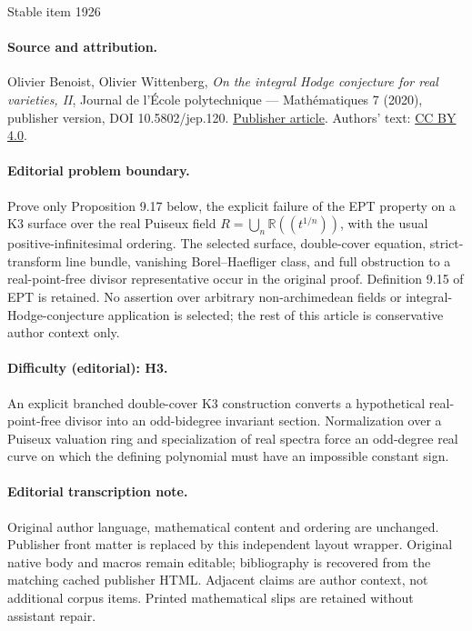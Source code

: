 \documentclass[11pt]{article}
\theoremstyle{plain}
\theoremstyle{definition}
\numberwithin{equation}{section}
\begin{document}
\begin{center}{\Large Stable item 1926}\end{center}
\paragraph{Source and attribution.}
Olivier Benoist, Olivier Wittenberg, \emph{On the integral Hodge conjecture for real varieties, II}, Journal de l’École polytechnique — Mathématiques 7 (2020), publisher version, DOI 10.5802/jep.120. \href{https://jep.centre-mersenne.org/articles/10.5802/jep.120/}{Publisher article}. Authors' text: \href{https://creativecommons.org/licenses/by/4.0/}{CC BY 4.0}.
\paragraph{Editorial problem boundary.}
Prove only Proposition 9.17 below, the explicit failure of the EPT property on a K3 surface over the real Puiseux field \(R=\bigcup_n\mathbb R((t^{1/n}))\), with the usual positive-infinitesimal ordering. The selected surface, double-cover equation, strict-transform line bundle, vanishing Borel--Haefliger class, and full obstruction to a real-point-free divisor representative occur in the original proof. Definition 9.15 of EPT is retained. No assertion over arbitrary non-archimedean fields or integral-Hodge-conjecture application is selected; the rest of this article is conservative author context only.
\paragraph{Difficulty (editorial): H3.}
An explicit branched double-cover K3 construction converts a hypothetical real-point-free divisor into an odd-bidegree invariant section. Normalization over a Puiseux valuation ring and specialization of real spectra force an odd-degree real curve on which the defining polynomial must have an impossible constant sign.
\paragraph{Editorial transcription note.}
Original author language, mathematical content and ordering are unchanged. Publisher front matter is replaced by this independent layout wrapper. Original native body and macros remain editable; bibliography is recovered from the matching cached publisher HTML. Adjacent claims are author context, not additional corpus items. Printed mathematical slips are retained without assistant repair.
\clearpage
\end{document}
